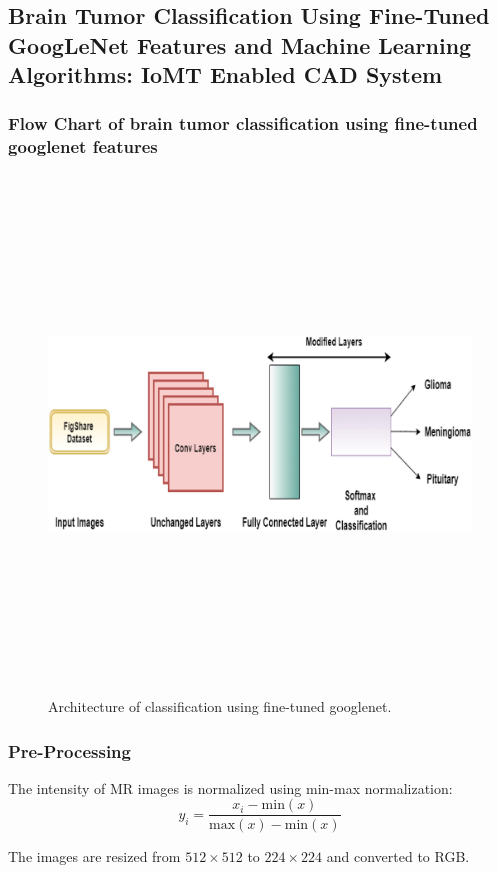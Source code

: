 \documentclass[a4paper,12pt]{extarticle}
\begin{document}
\newpage
\subsection{Brain Tumor Classification Using Fine-Tuned
GoogLeNet Features and Machine Learning
Algorithms: IoMT Enabled CAD System}
\subsubsection{Flow Chart of brain tumor classification using fine-tuned googlenet features}
\begin{figure}[H] %
    \centering
    \includegraphics[width=\linewidth, height=13.7cm, keepaspectratio]{figure/archi.png}
    \caption{Architecture of classification using fine-tuned googlenet.}
    \label{fig:Architecture of classification using fine-tuned googlenet.}
\end{figure}
\subsubsection{Pre-Processing}
The intensity of MR images is normalized using min-max normalization:
\[ y_i = \frac{x_i - \text{min}(x)}{\text{max}(x) - \text{min}(x)} \]

The images are resized from \(512 \times 512\) to \(224 \times 224\) and converted to RGB.
\end{document}
